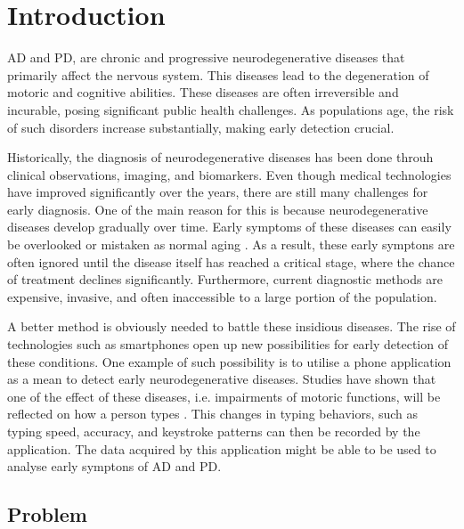 \chapter{Introduction}


\ac{AD} and \ac{PD}, are chronic and progressive neurodegenerative diseases that primarily affect the nervous system.
This diseases lead to the degeneration of motoric and cognitive abilities.
These diseases are often irreversible and incurable, posing significant public health challenges.
As populations age, the risk of such disorders increase substantially, making early detection crucial.

Historically, the diagnosis of neurodegenerative diseases has been done throuh clinical observations, imaging, and biomarkers.
Even though medical technologies have improved significantly over the years, there are still many challenges for early diagnosis.
One of the main reason for this is because neurodegenerative diseases develop gradually over time.
Early symptoms of these diseases can easily be overlooked or mistaken as normal aging \cite{manera2023}.
As a result, these early symptons are often ignored until the disease itself has reached a critical stage, where the chance of treatment declines significantly. 
Furthermore, current diagnostic methods are expensive, invasive, and often inaccessible to a large portion of the population.

A better method is obviously needed to battle these insidious diseases.
The rise of technologies such as smartphones open up new possibilities for early detection of these conditions.
One example of such possibility is to utilise a phone application as a mean to detect early neurodegenerative diseases.
Studies have shown that one of the effect of these diseases, i.e. impairments of motoric functions, will be reflected on how a person types \cite{mcisaac2023}.
This changes in typing behaviors, such as typing speed, accuracy, and keystroke patterns can then be recorded by the application.
The data acquired by this application might be able to be used to analyse early symptons of \ac{AD} and \ac{PD}.

\section{Problem}


